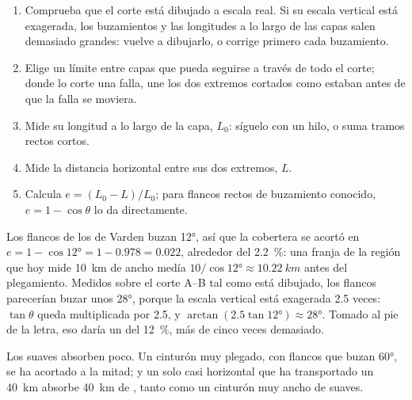 \begin{method}\label{met:g12:mountain-building:shortening}
\begin{enumerate}
  \item Comprueba que el corte está dibujado a escala real. Si su escala
        vertical está exagerada, los buzamientos y las longitudes a lo largo de
        las capas salen demasiado grandes: vuelve a dibujarlo, o corrige
        primero cada buzamiento.
  \item Elige un límite entre capas que pueda seguirse a través de todo el
        corte; donde lo corte una falla, une los dos extremos cortados como
        estaban antes de que la falla se moviera.
  \item Mide su longitud a lo largo de la capa, $L_0$: síguelo con un hilo,
        o suma tramos rectos cortos.
  \item Mide la distancia horizontal entre sus dos extremos, $L$.
  \item Calcula $e = (L_0 - L)/L_0$; para flancos rectos de buzamiento
        conocido, $e = 1 - \cos\theta$ lo da directamente.
\end{enumerate}
\end{method}

\begin{example}\label{ex:g12:mountain-building:varden}
Los flancos de los  de Varden buzan \ang{12}, así que la cobertera se
acortó en $e = 1 - \cos\ang{12} = 1 - 0.978 = 0.022$, alrededor del
\qty{2.2}{\percent}: una franja de la región que hoy mide \qty{10}{km} de
ancho medía $10/\cos\ang{12} \approx
\qty{10.22}{km}$ antes del plegamiento. Medidos sobre el corte A--B tal como
está dibujado, los flancos parecerían buzar unos \ang{28}, porque la escala
vertical está exagerada 2.5 veces: $\tan\theta$ queda multiplicada por 2.5, y $\arctan(2.5
\tan\ang{12}) \approx \ang{28}$. Tomado al pie de la letra, eso daría un
 del \qty{12}{\percent}, más de cinco veces demasiado.
\end{example}

Los  suaves absorben poco. Un cinturón muy plegado, con flancos que
buzan \ang{60}, se ha acortado a la mitad; y un solo  casi
horizontal que ha transportado un  \qty{40}{km} absorbe
\qty{40}{km} de , tanto como un cinturón muy ancho de 
suaves.

